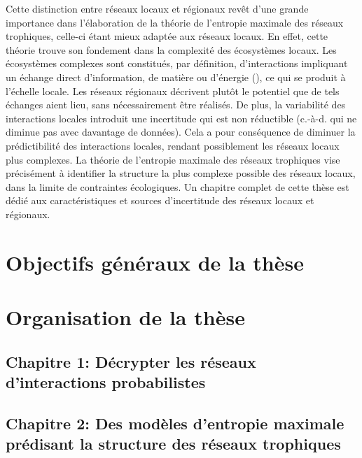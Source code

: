 Cette distinction entre réseaux locaux et régionaux revêt d'une grande
importance dans l'élaboration de la théorie de l'entropie maximale des réseaux
trophiques, celle-ci étant mieux adaptée aux réseaux locaux. En effet, cette
théorie trouve son fondement dans la complexité des écosystèmes locaux. Les
écosystèmes complexes sont constitués, par définition, d'interactions impliquant
un échange direct d'information, de matière ou d'énergie
(\cite{Ladyman2013What}), ce qui se produit à l'échelle locale. Les réseaux
régionaux décrivent plutôt le potentiel que de tels échanges aient lieu, sans
nécessairement être réalisés. De plus, la variabilité des interactions locales
introduit une incertitude qui est non réductible (c.-à-d. qui ne diminue pas
avec davantage de données). Cela a pour conséquence de diminuer la prédictibilité des
interactions locales, rendant possiblement les réseaux locaux plus complexes. La
théorie de l'entropie maximale des réseaux trophiques vise précisément à
identifier la structure la plus complexe possible des réseaux locaux, dans la
limite de contraintes écologiques. Un chapitre complet de cette thèse est dédié
aux caractéristiques et sources d'incertitude des réseaux locaux et régionaux.



\section{Objectifs généraux de la thèse} 



\section{Organisation de la thèse}

\subsection{Chapitre 1: Décrypter les réseaux d'interactions probabilistes} 

\subsection{Chapitre 2: Des modèles d'entropie maximale prédisant la structure des réseaux trophiques} 

\endinput
